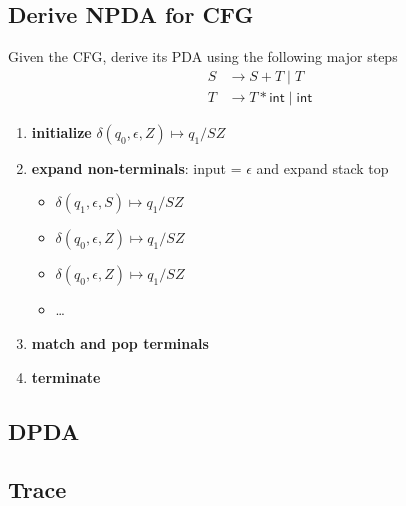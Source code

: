 \documentclass[10pt,a4paper,landscape]{article}
\newcommand{\gor}{\;|\;}
\begin{document}
\begin{multicols*}{3}
\subsection*{Derive NPDA for CFG}
Given the CFG, derive its PDA using the following major steps
\begin{align*}
  S &\rightarrow S + T \gor T\\
  T &\rightarrow T * \mathsf{int} \gor \mathsf{int}
\end{align*}
\begin{enumerate}
\item \textbf{initialize} \(\delta(q_{0},\epsilon,Z) \mapsto q_{1}/SZ\)
\item \textbf{expand non-terminals}: input = \(\epsilon\) and expand stack top
  \begin{itemize}
  \item \(\delta(q_{1},\epsilon,S) \mapsto q_{1}/SZ\)
  \item \(\delta(q_{0},\epsilon,Z) \mapsto q_{1}/SZ\)
  \item \(\delta(q_{0},\epsilon,Z) \mapsto q_{1}/SZ\)
  \item \ldots
  \end{itemize}
\item \textbf{match and pop terminals}
\item \textbf{terminate}
\end{enumerate}
\subsection*{DPDA}
\subsection*{Trace}

\end{multicols*}
\end{document}
